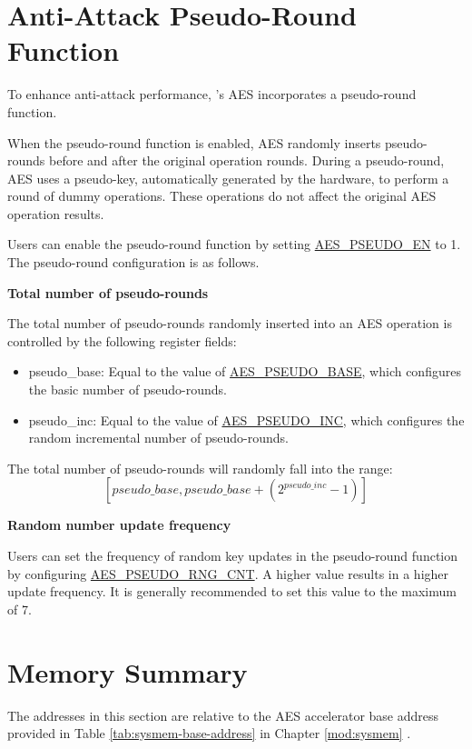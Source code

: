 \documentclass[main\_\_EN.tex]{subfiles}
\begin{document}
\section{Anti-Attack Pseudo-Round Function}\label{aes-pseudo-round}

To enhance anti-attack performance, \chipname{}'s AES incorporates a pseudo-round function.

When the pseudo-round function is enabled, AES randomly inserts pseudo-rounds before and after the original operation rounds. During a pseudo-round, AES uses a pseudo-key, automatically generated by the hardware, to perform a round of dummy operations. These operations do not affect the original AES operation results.

Users can enable the pseudo-round function by setting \hyperref[fielddesc:AESPSEUDOEN]{AES\_PSEUDO\_EN} to 1. The pseudo-round configuration is as follows.

\textbf{Total number of pseudo-rounds}

The total number of pseudo-rounds randomly inserted into an AES operation is controlled by the following register fields:
\begin{itemize}
    \item pseudo\_base: Equal to the value of \hyperref[fielddesc:AESPSEUDOBASE]{AES\_PSEUDO\_BASE}, which configures the basic number of pseudo-rounds.
    \item pseudo\_inc: Equal to the value of \hyperref[fielddesc:AESPSEUDOINC]{AES\_PSEUDO\_INC}, which configures the random incremental number of pseudo-rounds.
\end{itemize}

The total number of pseudo-rounds will randomly fall into the range:$$[pseudo\_base,pseudo\_base+(2^{pseudo\_inc}-1)]$$

\textbf{Random number update frequency}

Users can set the frequency of random key updates in the pseudo-round function by configuring \hyperref[fielddesc:AESPSEUDORNGCNT]{AES\_PSEUDO\_RNG\_CNT}. A higher value results in a higher update frequency. It is generally recommended to set this value to the maximum of 7.

\clearpage
\section{Memory Summary}\label{aesMemorySummary}

The addresses in this section are relative to the AES accelerator base address provided in Table \ref{tab:sysmem-base-address} in Chapter \ref{mod:sysmem} \textit{}.
\end{document}
